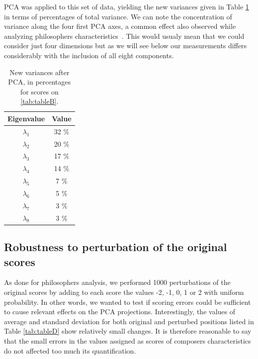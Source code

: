 \documentclass[
 aip,
 jmp,
 amsmath,amssymb,
 reprint,
]{revtex4-1}
\begin{document}
PCA was applied to this set of data, yielding the new variances given
in Table \ref{tab:tableC} in terms of percentages of total variance.
We can note the concentration of variance along the four
first PCA axes, a common effect also observed while analyzing
philosophers characteristics~\cite{Fabbri}. This would usualy mean that we could
consider just four dimensions but as we will see below our measurements
differs considerably with the inclusion of all eight components.

\begin{table}[ht]
\caption{\label{tab:tableC}New variances after PCA, in percentages for
  scores on \ref{tab:tableB}.}

\begin{tabular}{|c||c|}
\hline
Eigenvalue  & Value     \\ \hline

$\lambda_1$ &  32 \% \\
$\lambda_2$ &  20 \% \\
$\lambda_3$ &  17 \% \\
$\lambda_4$ &  14 \% \\
$\lambda_5$ &   7 \% \\
$\lambda_6$ &   5 \% \\
$\lambda_7$ &   3 \% \\
$\lambda_8$ &   3 \% \\
\hline

\end{tabular}
\end{table}

\subsection{Robustness to perturbation of the original scores}

As done for philosophers analysis, we performed 1000 perturbations of
the original scores by adding to each score the values -2, -1, 0, 1 or 2 with
uniform probability. In other words, we wanted to test if scoring
errors could be sufficient to cause relevant effects
on the PCA projections. Interestingly, the values of average and
standard deviation for both original and perturbed positions listed in Table
\ref{tab:tableD} show relatively small changes. It is therefore
reasonable to say that the small errors in the values assigned as scores of composers
characteristics do not affected too much its quantification.
\end{document}
